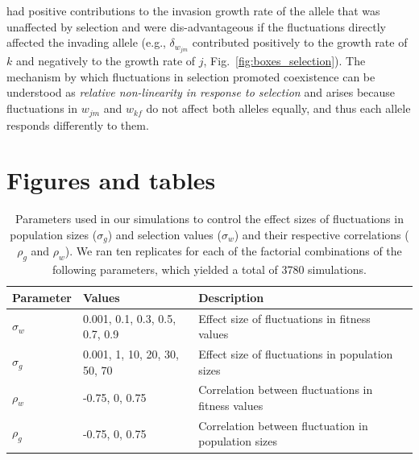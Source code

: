 \documentclass[12pt]{article}
\begin{document}
had positive contributions to the invasion growth rate of the allele that was unaffected by selection and were dis-advantageous if the fluctuations directly affected the invading allele  (e.g., $\delta_{w_{jm}}$ contributed positively to the growth rate of $k$ and negatively to the growth rate of $j$, Fig.~\ref{fig:boxes_selection}). The mechanism by which fluctuations in selection promoted coexistence can be understood as \textit{relative non-linearity in response to selection} and arises because fluctuations in $w_{jm}$ and $w_{kf}$ do not affect both alleles equally, and thus each allele responds differently to them.


\clearpage
\section*{Figures and tables }


\begin{table}[h]
\fontsize{10}{18}\selectfont
\centering
\caption{Parameters used in our simulations to control the effect sizes of fluctuations in population sizes ($\sigma_{g}$) and selection values ($\sigma_{w}$) and their respective correlations ($\rho_{g}$ and $\rho_{w}$). We ran ten replicates for each of the factorial combinations of the following parameters, which yielded a total of 3780 simulations. }
\begin{tabular}{@{}llll@{}}
\toprule
Parameter                    & Values                    & Description                                   &  \\ \midrule
$\sigma_{w}$ & 0.001, 0.1, 0.3, 0.5, 0.7, 0.9 & Effect size of fluctuations in fitness values &  \\
$\sigma_{g}$ & 0.001, 1, 10, 20, 30, 50, 70 & Effect size of fluctuations in population sizes                                              &  \\
$\rho_{w}$  &  -0.75, 0, 0.75                         &   Correlation between fluctuations in fitness values                                            &  \\
$\rho_{g}$  &   -0.75, 0, 0.75                        &  Correlation between fluctuation in population sizes                                             &  \\ \bottomrule
\end{tabular}
\label{tab:fluctuations}
\end{table}
\end{document}
